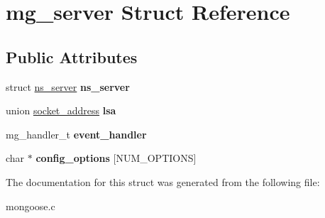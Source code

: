 \hypertarget{structmg__server}{\section{mg\-\_\-server Struct Reference}
\label{structmg__server}
}
\subsection*{Public Attributes}
\begin{DoxyCompactItemize}
\item 
\hypertarget{structmg__server_aae82596eb59f601ae99ef20f23c12017}{struct \hyperlink{structns__server}{ns\-\_\-server} {\bfseries ns\-\_\-server}}\label{structmg__server_aae82596eb59f601ae99ef20f23c12017}

\item 
\hypertarget{structmg__server_acbc9c742af372629b15619508931d1c5}{union \hyperlink{unionsocket__address}{socket\-\_\-address} {\bfseries lsa}}\label{structmg__server_acbc9c742af372629b15619508931d1c5}

\item 
\hypertarget{structmg__server_af5d370b4300b218d63d7c6a7b4a7791d}{mg\-\_\-handler\-\_\-t {\bfseries event\-\_\-handler}}\label{structmg__server_af5d370b4300b218d63d7c6a7b4a7791d}

\item 
\hypertarget{structmg__server_a873aee94660c99fb7b4a8a872636f619}{char $\ast$ {\bfseries config\-\_\-options} \mbox{[}N\-U\-M\-\_\-\-O\-P\-T\-I\-O\-N\-S\mbox{]}}\label{structmg__server_a873aee94660c99fb7b4a8a872636f619}

\end{DoxyCompactItemize}


The documentation for this struct was generated from the following file\-:\begin{DoxyCompactItemize}
\item 
mongoose.\-c\end{DoxyCompactItemize}
